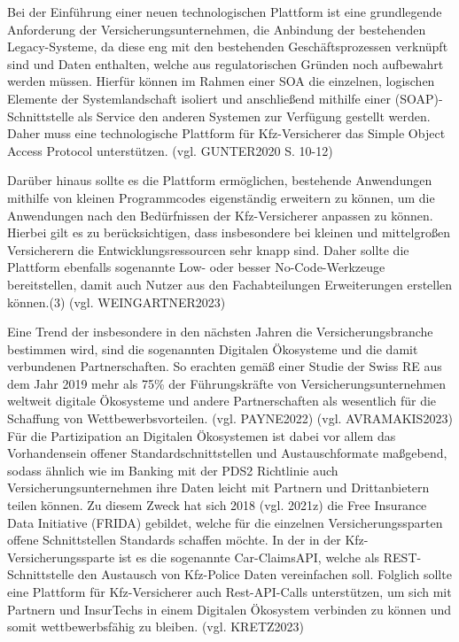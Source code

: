 Bei der Einführung einer neuen technologischen Plattform ist eine grundlegende Anforderung der Versicherungsunternehmen, die Anbindung der bestehenden Legacy-Systeme, da diese eng mit den bestehenden Geschäftsprozessen verknüpft sind und Daten enthalten, welche aus regulatorischen Gründen noch aufbewahrt werden müssen. Hierfür können im Rahmen einer SOA die einzelnen, logischen Elemente der Systemlandschaft isoliert und anschließend mithilfe einer (SOAP)-Schnittstelle als Service den anderen Systemen zur Verfügung gestellt werden. Daher muss eine technologische Plattform für Kfz-Versicherer das Simple Object Access Protocol unterstützen. (vgl. GUNTER2020 S. 10-12)

Darüber hinaus sollte es die Plattform ermöglichen, bestehende Anwendungen mithilfe von kleinen Programmcodes eigenständig erweitern zu können, um die Anwendungen nach den Bedürfnissen der Kfz-Versicherer anpassen zu können. Hierbei gilt es zu berücksichtigen, dass insbesondere bei kleinen und mittelgroßen Versicherern die Entwicklungsressourcen sehr knapp sind. Daher sollte die Plattform ebenfalls sogenannte Low- oder besser No-Code-Werkzeuge bereitstellen, damit auch Nutzer aus den Fachabteilungen Erweiterungen erstellen können.(3) (vgl. WEINGARTNER2023)

Eine Trend der insbesondere in den nächsten Jahren die Versicherungsbranche bestimmen wird, sind die sogenannten Digitalen Ökosysteme und die damit verbundenen Partnerschaften. So erachten gemäß einer Studie der Swiss RE aus dem Jahr 2019 mehr als 75\% der Führungskräfte von Versicherungsunternehmen weltweit digitale Ökosysteme und andere Partnerschaften als wesentlich für die Schaffung von Wettbewerbsvorteilen. (vgl. PAYNE2022) (vgl. AVRAMAKIS2023) Für die Partizipation an Digitalen Ökosystemen ist dabei vor allem das Vorhandensein offener Standardschnittstellen und Austauschformate maßgebend, sodass ähnlich wie im Banking mit der PDS2 Richtlinie auch Versicherungsunternehmen ihre Daten leicht mit Partnern und Drittanbietern  teilen können. Zu diesem Zweck hat sich 2018 (vgl. 2021z) die Free Insurance Data Initiative (FRIDA)  gebildet, welche für die einzelnen Versicherungssparten offene Schnittstellen Standards schaffen möchte. In der in der Kfz-Versicherungssparte ist es die sogenannte Car-ClaimsAPI, welche als REST-Schnittstelle den Austausch von Kfz-Police Daten vereinfachen soll. Folglich sollte eine Plattform für Kfz-Versicherer auch Rest-API-Calls unterstützen, um sich mit Partnern und InsurTechs in einem Digitalen Ökosystem verbinden zu können und somit wettbewerbsfähig zu bleiben. (vgl. KRETZ2023) 

